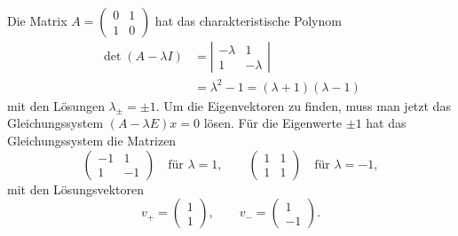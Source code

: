 \begin{beispiel}
Die Matrix $A=\begin{pmatrix}0&1\\1&0\end{pmatrix}$ hat das
charakteristische Polynom
\begin{align*}
\det(A-\lambda I)&=\left|\begin{matrix}-\lambda&1\\1&-\lambda\end{matrix}\right|\\
&=\lambda^2-1=(\lambda+1)(\lambda-1)
\end{align*}
mit den Lösungen $\lambda_\pm=\pm1$.
Um die Eigenvektoren zu finden, muss
man jetzt das Gleichungssystem $(A-\lambda E)x=0$ lösen.
Für die Eigenwerte $\pm1$ hat das Gleichungssystem die Matrizen
\[
\begin{pmatrix}
-1&1\\1&-1
\end{pmatrix}\quad \text{für $\lambda=1$},\qquad
\begin{pmatrix}
1&1\\1&1
\end{pmatrix}\quad\text{für $\lambda=-1$},
\]
mit den Lösungsvektoren
\[
v_+=\begin{pmatrix}1\\1\end{pmatrix},
\qquad
v_-=\begin{pmatrix}1\\-1\end{pmatrix}.
\]
\end{beispiel}

